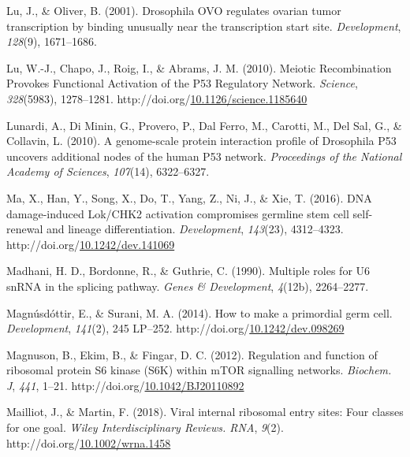 \documentclass[12pt,oneside]{reedthesis}
\newlength{\cslhangindent}
\newenvironment{CSLReferences}[2] %
 {%
  \setlength{\parindent}{0pt}
  \ifodd #1 \everypar{\setlength{\hangindent}{\cslhangindent}}\ignorespaces\fi
  \ifnum #2 > 0
  \setlength{\parskip}{#2\baselineskip}
  \fi
 }%
 {}
\begin{document}
\begin{CSLReferences}{1}{0}
\leavevmode{}%
Lu, J., \& Oliver, B. (2001). Drosophila {OVO} regulates ovarian tumor transcription by binding unusually near the transcription start site. \emph{Development}, \emph{128}(9), 1671--1686.

\leavevmode{}%
Lu, W.-J., Chapo, J., Roig, I., \& Abrams, J. M. (2010). Meiotic {Recombination Provokes Functional Activation} of the P53 {Regulatory Network}. \emph{Science}, \emph{328}(5983), 1278--1281. http://doi.org/\href{https://doi.org/10.1126/science.1185640}{10.1126/science.1185640}

\leavevmode{}%
Lunardi, A., Di Minin, G., Provero, P., Dal Ferro, M., Carotti, M., Del Sal, G., \& Collavin, L. (2010). A genome-scale protein interaction profile of {Drosophila} P53 uncovers additional nodes of the human P53 network. \emph{Proceedings of the National Academy of Sciences}, \emph{107}(14), 6322--6327.

\leavevmode{}%
Ma, X., Han, Y., Song, X., Do, T., Yang, Z., Ni, J., \& Xie, T. (2016). {DNA} damage-induced {Lok}/{CHK2} activation compromises germline stem cell self-renewal and lineage differentiation. \emph{Development}, \emph{143}(23), 4312--4323. http://doi.org/\href{https://doi.org/10.1242/dev.141069}{10.1242/dev.141069}

\leavevmode{}%
Madhani, H. D., Bordonne, R., \& Guthrie, C. (1990). Multiple roles for {U6 snRNA} in the splicing pathway. \emph{Genes \& Development}, \emph{4}(12b), 2264--2277.

\leavevmode{}%
Magnúsdóttir, E., \& Surani, M. A. (2014). How to make a primordial germ cell. \emph{Development}, \emph{141}(2), 245 LP--252. http://doi.org/\href{https://doi.org/10.1242/dev.098269}{10.1242/dev.098269}

\leavevmode{}%
Magnuson, B., Ekim, B., \& Fingar, D. C. (2012). Regulation and function of ribosomal protein {S6} kinase ({S6K}) within {mTOR} signalling networks. \emph{Biochem. J}, \emph{441}, 1--21. http://doi.org/\href{https://doi.org/10.1042/BJ20110892}{10.1042/BJ20110892}

\leavevmode{}%
Mailliot, J., \& Martin, F. (2018). Viral internal ribosomal entry sites: Four classes for one goal. \emph{Wiley Interdisciplinary Reviews. RNA}, \emph{9}(2). http://doi.org/\href{https://doi.org/10.1002/wrna.1458}{10.1002/wrna.1458}


\end{CSLReferences}
\end{document}

